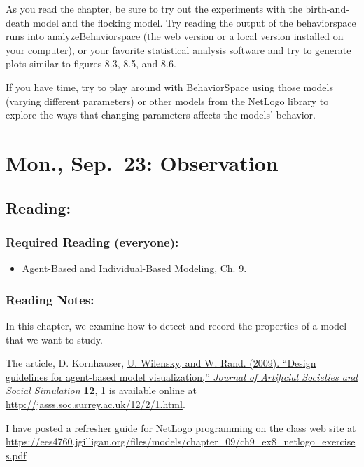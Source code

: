 \documentclass[
]{article}
\providecommand{\tightlist}{%
  \setlength{\itemsep}{0pt}\setlength{\parskip}{0pt}}
\begin{document}
As you read the chapter, be sure to try out the experiments with the
birth-and-death model and the flocking model. Try reading the output of
the behaviorspace runs into analyzeBehaviorspace (the web version or a
local version installed on your computer), or your favorite statistical
analysis software and try to generate plots similar to figures 8.3, 8.5,
and 8.6.

If you have time, try to play around with BehaviorSpace using those
models (varying different parameters) or other models from the NetLogo
library to explore the ways that changing parameters affects the models'
behavior.

\section{Mon., Sep.~23: Observation}\label{mon.-sep.-23-observation}

\subsection{Reading:}\label{reading-9}

\subsubsection{Required Reading
(everyone):}\label{required-reading-everyone-8}

\begin{itemize}
\tightlist
\item
  Agent-Based and Individual-Based Modeling, Ch. 9.
\end{itemize}

\subsubsection{Reading Notes:}\label{reading-notes-8}

In this chapter, we examine how to detect and record the properties of a
model that we want to study.

The article, D. Kornhauser,
\href{http://jasss.soc.surrey.ac.uk/12/2/1.html}{U. Wilensky, and W.
Rand. (2009). ``Design guidelines for agent-based model visualization,''
\emph{Journal of Artificial Societies and Social Simulation}
\textbf{12}, 1} is available online at
\url{http://jasss.soc.surrey.ac.uk/12/2/1.html}.

I have posted a
\href{/files/models/chapter_09/ch9_ex8_netlogo_exercises.pdf}{refresher
guide} for NetLogo programming on the class web site at
\url{https://ees4760.jgilligan.org/files/models/chapter_09/ch9_ex8_netlogo_exercises.pdf}
\end{document}
